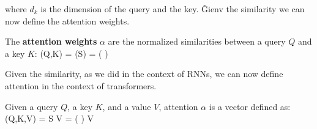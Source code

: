 where $d_k$ is the dimension of the query and the key. \v

Gienv the similarity we can now define the attention weights.

The \textbf{attention weights} $\alpha$ are the normalized similarities between a query $Q$ and a key $K$:
\bse
\alpha(Q,K) = (S) = \Big(  \Big)
\ese
\ed

Given the similarity, as we did in the context of RNNs, we can now define attention in the context of transformers.

\bd[Attention]
Given a query $Q$, a key $K$, and a value $V$, attention $\alpha$ is a vector defined as:
\bse
\boldsymbol{\alpha}(Q,K,V) = S \times V = \Big(  \Big) \times V
\ese
\ed


